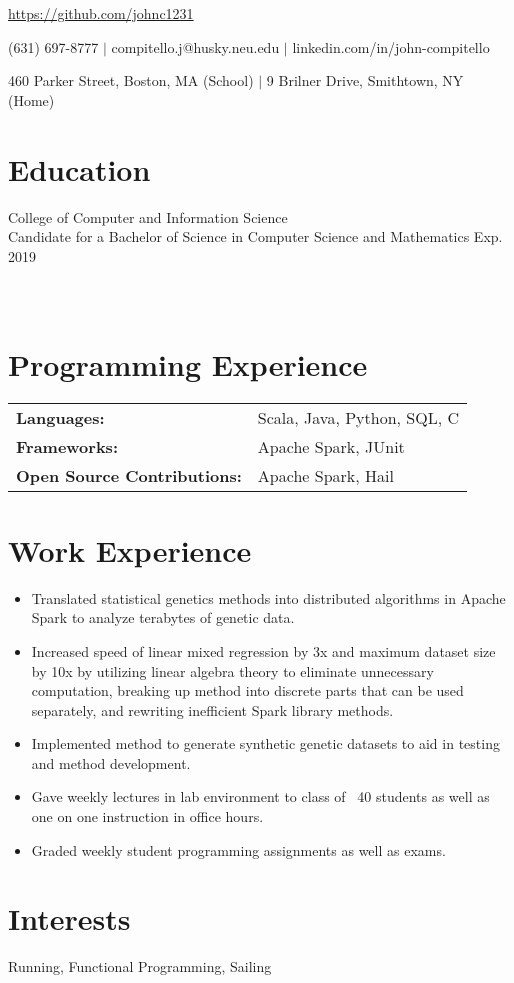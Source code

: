 \documentclass[12pt]{john_resume}
\begin{document}
\centerline{\url{https://github.com/johnc1231}}
\centerline{(631) 697-8777 $|$ compitello.j@husky.neu.edu $|$ linkedin.com/in/john-compitello}
\centerline{460 Parker Street, Boston, MA (School) $|$ 9 Brilner Drive, Smithtown, NY (Home)}

\section{Education}
College of Computer and Information Science\\
Candidate for a Bachelor of Science in Computer Science and Mathematics \hspace*{\fill} Exp. 2019 \\
 \\
 \\

\section{Programming Experience}
\begin{tabular}{l l}
\textbf{Languages:} & Scala, Java, Python, SQL, C\\
\textbf{Frameworks:} & Apache Spark, JUnit \\
\textbf{Open Source Contributions:} & Apache Spark, Hail
\end{tabular}

\section{Work Experience}

\begin{itemize}
	\item Translated statistical genetics methods into distributed algorithms in Apache Spark to analyze 
		terabytes of genetic data.
	\item Increased speed of linear mixed regression by 3x and maximum dataset size by 10x by utilizing 
		linear algebra theory to eliminate unnecessary computation, breaking up method into discrete parts 	
		that can be used separately, and rewriting inefficient Spark library methods. 
	\item Implemented method to generate synthetic genetic datasets to aid in testing and method 
		development.
\end{itemize}
\begin{itemize}
	\item Gave weekly lectures in lab environment to class of ~40 students as well as one on one instruction in office hours. 
	\item Graded weekly student programming assignments as well as exams.
\end{itemize}


\section{Interests}
Running, Functional Programming, Sailing
\end{document}
